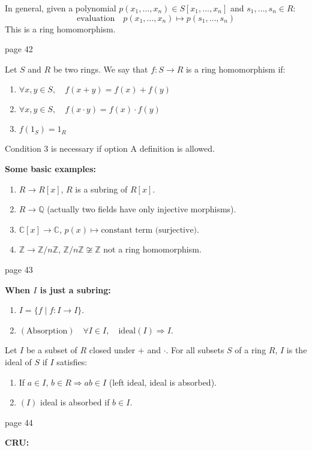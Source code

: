 \documentclass{article}
\begin{document}
In general, given a polynomial $p(x_1, \ldots, x_n) \in S[x_1, \ldots, x_n]$ and $s_1, \ldots, s_n \in R$:
\[
\text{evaluation} \quad p(x_1, \ldots, x_n) \mapsto p(s_1, \ldots, s_n)
\]
This is a ring homomorphism.

\newpage
\noindent page 42

Let $S$ and $R$ be two rings. We say that $f: S \to R$ is a ring homomorphism if:
\begin{enumerate}
    \item $\forall x, y \in S, \quad f(x + y) = f(x) + f(y)$
    \item $\forall x, y \in S, \quad f(x \cdot y) = f(x) \cdot f(y)$
    \item $f(1_S) = 1_R$
\end{enumerate}
Condition 3 is necessary if option A definition is allowed.

\textbf{Some basic examples:}
\begin{enumerate}
    \item $R \to R[x]$, $R$ is a subring of $R[x]$.
    \item $R \to \mathbb{Q}$ (actually two fields have only injective morphisms).
    \item $\mathbb{C}[x] \to \mathbb{C}$, $p(x) \mapsto \text{constant term (surjective)}$.
    \item $\mathbb{Z} \to \mathbb{Z}/n\mathbb{Z}$, $\mathbb{Z}/n\mathbb{Z} \not\cong \mathbb{Z}$ not a ring homomorphism.
\end{enumerate}

\newpage
\noindent page 43

\textbf{When $I$ is just a subring:}
\begin{enumerate}
    \item $I = \{ f \mid f : I \to I \}$.
    \item $(\text{Absorption}) \quad \forall I \in I, \quad \text{ideal} (I) \Rightarrow I$.
\end{enumerate}
Let $I$ be a subset of $R$ closed under $+$ and $\cdot$. For all subsets $S$ of a ring $R$, $I$ is the ideal of $S$ if $I$ satisfies:
\begin{enumerate}
    \item If $a \in I$, $b \in R \Rightarrow ab \in I$ (left ideal, ideal is absorbed).
    \item $(I)$ ideal is absorbed if $b \in I$.
\end{enumerate}

\newpage
\noindent page 44

\textbf{CRU:}
\end{document}
